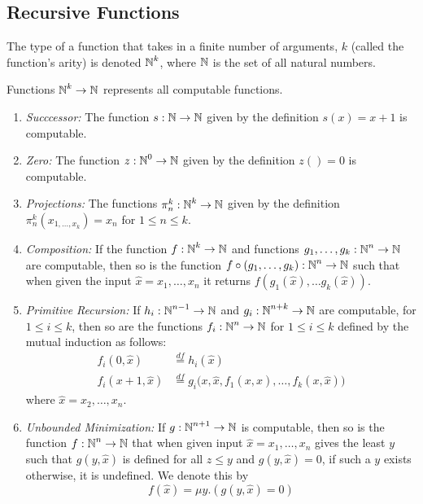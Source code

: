\subsection{Recursive Functions}\label{subsec:Recursive_Functions}
The type of a function that takes in a finite number of arguments, $k$ (called the function's arity) is denoted $\operatorname{\mathbb{N}}^{k}$, where $\operatorname{\mathbb{N}}$ is the set of all natural numbers.

Functions $\operatorname{\mathbb{N}}^{k} \rightarrow \operatorname{\mathbb{N}}$ represents all computable functions.
\begin{enumerate}[noitemsep]
\item \emph{Succcessor:} The function $s : \operatorname{\mathbb{N}} \rightarrow \operatorname{\mathbb{N}}$ given by the definition $s(x) = x + 1$ is computable.
\item \emph{Zero:} The function $z : \operatorname{\mathbb{N}}^{0} \rightarrow \operatorname{\mathbb{N}}$ given by the definition $z() = 0$ is computable.
\item \emph{Projections:} The functions $\pi_{n}^{k} : \operatorname{\mathbb{N}}^{k} \rightarrow \operatorname{\mathbb{N}}$ given by the definition $\pi_{n}^{k}(x_{1, \ldots, x_{k}}) = x_{n}$ for $1 \leq n \leq k$.
\item \emph{Composition:} If the function $f : \operatorname{\mathbb{N}}^{k} \rightarrow \operatorname{\mathbb{N}}$ and functions $g_{1}, \ldots, g_{k} : \operatorname{\mathbb{N}}^{n} \rightarrow \operatorname{\mathbb{N}}$ are computable, then so is the function $f \circ (g_{1}, \ldots, g_{k}) : \operatorname{\mathbb{N}}^{n} \rightarrow \operatorname{\mathbb{N}}$ such that when given the input $\hat{x} = x_{1}, \ldots, x_{n}$ it returns $f(g_{1}(\hat{x}), \ldots g_{k}(\hat{x}))$.
\item \emph{Primitive Recursion:} If $h_{i} : \operatorname{\mathbb{N}}^{n-1} \rightarrow \operatorname{\mathbb{N}}$ and $g_{i} : \operatorname{\mathbb{N}}^{n+k} \rightarrow \operatorname{\mathbb{N}}$ are computable, for $1 \leq i \leq k$, then so are the functions $f_{i} : \operatorname{\mathbb{N}}^{n} \rightarrow \operatorname{\mathbb{N}}$ for $1 \leq i \leq k$ defined by the mutual induction as follows:
  \begin{align*}
    f_{i}(0, \hat{x}) &\overset{df}{=} h_{i}(\hat{x}) \\
    f_{i}(x+1, \hat{x}) &\overset{df}{=} g_{i} \bigl( x, \hat{x}, f_{1}(x, \hat{x}), \ldots, f_{k}(x, \hat{x}) \bigr)
  \end{align*}
  where $\hat{x} = x_{2}, \ldots, x_{n}$.
\item \emph{Unbounded Minimization:} If $g : \operatorname{\mathbb{N}}^{n+1} \rightarrow \operatorname{\mathbb{N}}$ is computable, then so is the function $f : \operatorname{\mathbb{N}}^{n} \rightarrow \operatorname{\mathbb{N}}$ that when given input $\hat{x} = x_{1}, \ldots, x_{n}$ gives the least $y$ such that $g(y, \hat{x})$ is defined for all $z \leq y$ and $g(y, \hat{x}) = 0$, if such a $y$ exists otherwise, it is undefined.
  We denote this by
  \begin{equation*}
    f(\hat{x}) = \mu y. (g (y, \hat{x}) = 0)
  \end{equation*}
\end{enumerate}

